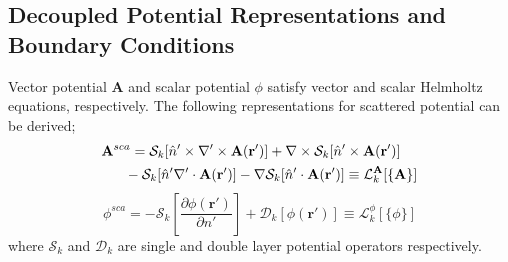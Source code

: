 \documentclass[conference]{IEEEtran}
\begin{document}
\subsection{ Decoupled Potential Representations and Boundary Conditions}
Vector potential $\mathbf{A}$ and scalar potential $\phi$ satisfy vector and scalar Helmholtz equations, respectively. The following representations for scattered potential can be derived; 
\begin{equation}
\label{equ:rep_vec}
\begin{aligned}
& \mathbf{A}^{sca}=  \mathcal{S}_k[\hat{n}'\times \nabla' \times \mathbf{A}(\mathbf{r}')] + \nabla \times \mathcal{S}_k [ \hat{n}'\times \mathbf{A}(\mathbf{r}')]  \\
  & ~~~~~-  \mathcal{S}_k[ \hat{n}'  \nabla' \cdot \mathbf{A}(\mathbf{r}')]  - \nabla \mathcal{S}_k[ \hat{n}'  \cdot \mathbf{A}(\mathbf{r}')]
  \equiv \mathbf{\mathcal{L}}^{\bf A}_k[\{ {\bf A} \}]
\end{aligned}
\end{equation}
\begin{equation}
\label{equ:rep_sca}
\phi^{sca} = -\mathcal{S}_k[\frac{\partial \phi (\mathbf{r}')}{\partial n'}] + \mathcal{D}_k[\phi(\mathbf{r}')]
\equiv \mathcal{L}^{\phi}_k[\{ \phi \}]
\end{equation}
where $\mathcal{S}_k$ and $\mathcal{D}_k$ are single and double layer potential operators respectively.
\end{document}
